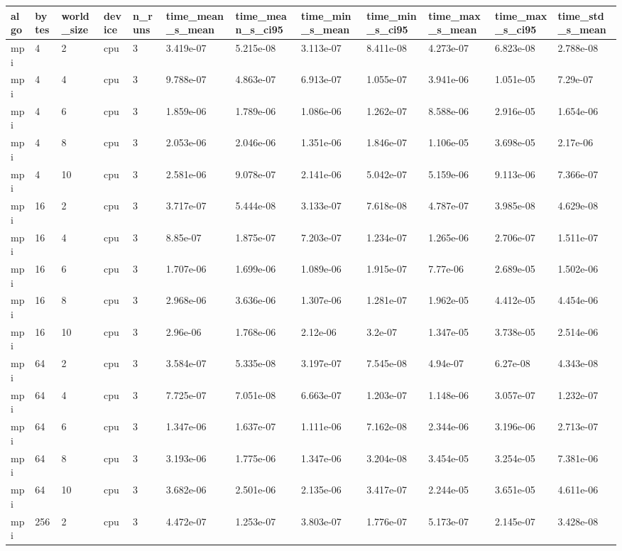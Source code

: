 \begin{tabular}{llllllllllll}
\hline
algo & bytes & world\_size & device & n\_runs & time\_mean\_s\_mean & time\_mean\_s\_ci95 & time\_min\_s\_mean & time\_min\_s\_ci95 & time\_max\_s\_mean & time\_max\_s\_ci95 & time\_std\_s\_mean \\
\hline
mpi & 4 & 2 & cpu & 3 & 3.419e-07 & 5.215e-08 & 3.113e-07 & 8.411e-08 & 4.273e-07 & 6.823e-08 & 2.788e-08 \\
mpi & 4 & 4 & cpu & 3 & 9.788e-07 & 4.863e-07 & 6.913e-07 & 1.055e-07 & 3.941e-06 & 1.051e-05 & 7.29e-07 \\
mpi & 4 & 6 & cpu & 3 & 1.859e-06 & 1.789e-06 & 1.086e-06 & 1.262e-07 & 8.588e-06 & 2.916e-05 & 1.654e-06 \\
mpi & 4 & 8 & cpu & 3 & 2.053e-06 & 2.046e-06 & 1.351e-06 & 1.846e-07 & 1.106e-05 & 3.698e-05 & 2.17e-06 \\
mpi & 4 & 10 & cpu & 3 & 2.581e-06 & 9.078e-07 & 2.141e-06 & 5.042e-07 & 5.159e-06 & 9.113e-06 & 7.366e-07 \\
mpi & 16 & 2 & cpu & 3 & 3.717e-07 & 5.444e-08 & 3.133e-07 & 7.618e-08 & 4.787e-07 & 3.985e-08 & 4.629e-08 \\
mpi & 16 & 4 & cpu & 3 & 8.85e-07 & 1.875e-07 & 7.203e-07 & 1.234e-07 & 1.265e-06 & 2.706e-07 & 1.511e-07 \\
mpi & 16 & 6 & cpu & 3 & 1.707e-06 & 1.699e-06 & 1.089e-06 & 1.915e-07 & 7.77e-06 & 2.689e-05 & 1.502e-06 \\
mpi & 16 & 8 & cpu & 3 & 2.968e-06 & 3.636e-06 & 1.307e-06 & 1.281e-07 & 1.962e-05 & 4.412e-05 & 4.454e-06 \\
mpi & 16 & 10 & cpu & 3 & 2.96e-06 & 1.768e-06 & 2.12e-06 & 3.2e-07 & 1.347e-05 & 3.738e-05 & 2.514e-06 \\
mpi & 64 & 2 & cpu & 3 & 3.584e-07 & 5.335e-08 & 3.197e-07 & 7.545e-08 & 4.94e-07 & 6.27e-08 & 4.343e-08 \\
mpi & 64 & 4 & cpu & 3 & 7.725e-07 & 7.051e-08 & 6.663e-07 & 1.203e-07 & 1.148e-06 & 3.057e-07 & 1.232e-07 \\
mpi & 64 & 6 & cpu & 3 & 1.347e-06 & 1.637e-07 & 1.111e-06 & 7.162e-08 & 2.344e-06 & 3.196e-06 & 2.713e-07 \\
mpi & 64 & 8 & cpu & 3 & 3.193e-06 & 1.775e-06 & 1.347e-06 & 3.204e-08 & 3.454e-05 & 3.254e-05 & 7.381e-06 \\
mpi & 64 & 10 & cpu & 3 & 3.682e-06 & 2.501e-06 & 2.135e-06 & 3.417e-07 & 2.244e-05 & 3.651e-05 & 4.611e-06 \\
mpi & 256 & 2 & cpu & 3 & 4.472e-07 & 1.253e-07 & 3.803e-07 & 1.776e-07 & 5.173e-07 & 2.145e-07 & 3.428e-08 \\

\end{tabular}
